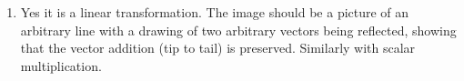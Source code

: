 \begin{SaveQuestion}
\begin{enumerate}
\begin{enumerate}
$$\begin{bmatrix}
		x_1+x_2\\y_1+y_2
		\end{bmatrix}\right)=\begin{bmatrix}
		x_1+x_2\\-(y_1+y_2)
		\end{bmatrix}$$
        $$=\begin{bmatrix}
		x_1\\-y_1
		\end{bmatrix}+\begin{bmatrix}
		x_2\\-y_2
		\end{bmatrix}=M\begin{bmatrix}
		x_1\\y_1
		\end{bmatrix}+M\begin{bmatrix}
		x_1\\y_1
		\end{bmatrix}$$
		and 
		$$ 
		M\left(k\begin{bmatrix}
		x\\y
		\end{bmatrix}\right)=M\begin{bmatrix}
		kx\\ky
		\end{bmatrix}=\begin{bmatrix}
		kx\\-ky
		\end{bmatrix}=k\begin{bmatrix}
		x\\-y
		\end{bmatrix}=kM\begin{bmatrix}
		x\\y
		\end{bmatrix}
		$$
		\item Yes it is a linear transformation. It's matrix is $$\begin{bmatrix}
		    0 & 1 \\ 1 & 0
		\end{bmatrix}$$ 
	\end{enumerate}
    \item Yes it is a linear transformation. The image should be a picture of an arbitrary line with a drawing of two arbitrary vectors being reflected, showing that the vector addition (tip to tail) is preserved. Similarly with scalar multiplication.
    \end{enumerate}
\end{SaveQuestion}



